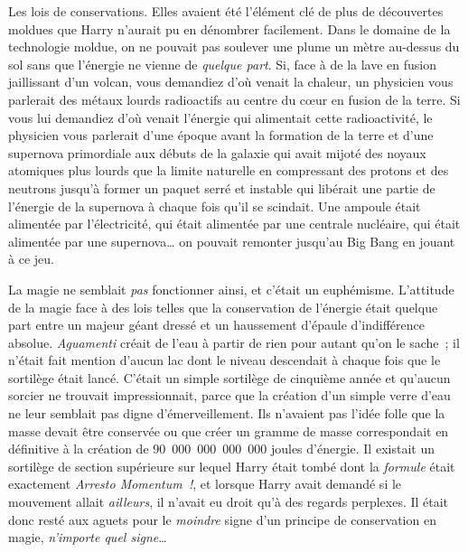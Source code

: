 Les lois de conservations.
Elles avaient été l'élément clé de plus de découvertes moldues que Harry n'aurait pu en dénombrer facilement.
Dans le domaine de la technologie moldue, on ne pouvait pas soulever une plume un mètre au-dessus du sol sans que l'énergie ne vienne de \emph{quelque part}.
Si, face à de la lave en fusion jaillissant d'un volcan, vous demandiez d'où venait la chaleur, un physicien vous parlerait des métaux lourds radioactifs au centre du cœur en fusion de la terre.
Si vous lui demandiez d'où venait l'énergie qui alimentait cette radioactivité, le physicien vous parlerait d'une époque avant la formation de la terre et d'une supernova primordiale aux débuts de la galaxie qui avait mijoté des noyaux atomiques plus lourds que la limite naturelle en compressant des protons et des neutrons jusqu'à former un paquet serré et instable qui libérait une partie de l'énergie de la supernova à chaque fois qu'il se scindait.
Une ampoule était alimentée par l'électricité, qui était alimentée par une centrale nucléaire, qui était alimentée par une supernova… on pouvait remonter jusqu'au Big Bang en jouant à ce jeu.

La magie ne semblait \emph{pas} fonctionner ainsi, et c'était un euphémisme.
L'attitude de la magie face à des lois telles que la conservation de l'énergie était quelque part entre un majeur géant dressé et un haussement d'épaule d'indifférence absolue.
\emph{Aguamenti} créait de l'eau à partir de rien pour autant qu'on le sache~; il n'était fait mention d'aucun lac dont le niveau descendait à chaque fois que le sortilège était lancé.
C'était un simple sortilège de cinquième année et qu'aucun sorcier ne trouvait impressionnait, parce que la création d'un simple verre d'eau ne leur semblait pas digne d'émerveillement.
Ils n'avaient pas l'idée folle que la masse devait être conservée ou que créer un gramme de masse correspondait en définitive à la création de 90~000~000~000~000 joules d'énergie.
Il existait un sortilège de section supérieure sur lequel Harry était tombé dont la \emph{formule} était exactement \emph{Arresto Momentum~!}, et lorsque Harry avait demandé si le mouvement allait \emph{ailleurs}, il n'avait eu droit qu'à des regards perplexes.
Il était donc resté aux aguets pour le \emph{moindre} signe d'un principe de conservation en magie, \emph{n'importe quel signe}…

